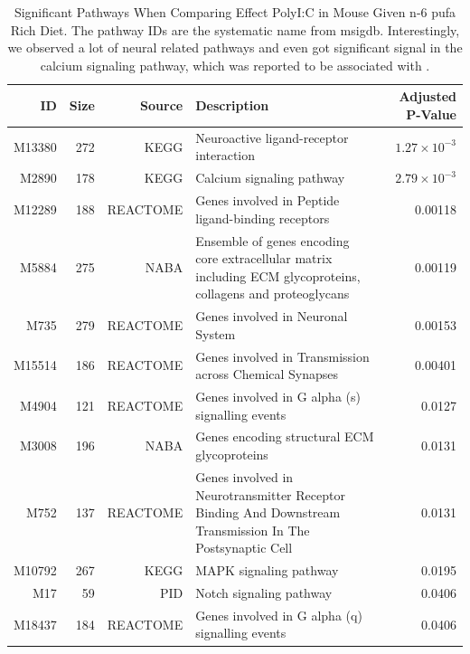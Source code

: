 \begin{landscape}
	\begin{table}
		\begin{tabular}{rrrp{10cm}r}
			\toprule
			ID&	Size&	Source&	Description&	Adjusted P-Value\\
			\midrule
			M13380&	272&	KEGG&	Neuroactive ligand-receptor interaction&	$1.27\times10^{-3}$\\
			M2890&	178&	KEGG&	Calcium signaling pathway&	$2.79\times10^{-3}$\\
			M12289&	188&	REACTOME&	Genes involved in Peptide ligand-binding receptors&	0.00118\\
			M5884&	275&	NABA&	Ensemble of genes encoding core extracellular matrix including ECM glycoproteins, collagens and proteoglycans&	0.00119\\
			M735&	279&	REACTOME&	Genes involved in Neuronal System&	0.00153\\
			M15514&	186&	REACTOME&	Genes involved in Transmission across Chemical Synapses&	0.00401\\
			M4904&	121&	REACTOME&	Genes involved in G alpha (s) signalling events&	0.0127\\
			M3008&	196&	NABA&	Genes encoding structural ECM glycoproteins&	0.0131\\
			M752&	137&	REACTOME&	Genes involved in Neurotransmitter Receptor Binding And Downstream Transmission In The Postsynaptic Cell&	0.0131\\
			M10792&	267&	KEGG&	MAPK signaling pathway&	0.0195\\
			M17&	59&	PID&	Notch signaling pathway&	0.0406\\
			M18437&	184&	REACTOME&	Genes involved in G alpha (q) signalling events&	0.0406\\
			\bottomrule
		\end{tabular}
		\caption[Significant Pathways When Comparing Effect PolyI:C in Mouse Given n-6 \gls{pufa} Rich Diet]{Significant Pathways When Comparing Effect PolyI:C in Mouse Given n-6 \gls{pufa} Rich Diet.
			The pathway IDs are the systematic name from \gls{msigdb}.
			Interestingly, we observed a lot of neural related pathways and even got significant signal in the calcium signaling pathway, which was reported to be associated with  \citep{Purcell2014}. 
		}
		\label{tab:miaPath}
	\end{table}
	

\end{landscape}
